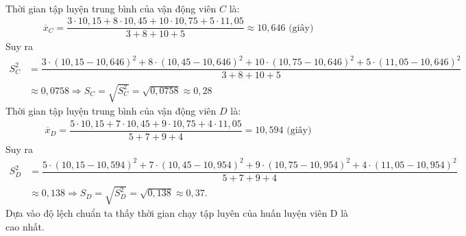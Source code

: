\begin{bt}
{\begin{align*}
		\end{align*}
		Thời gian tập luyện trung bình của vận động viên $C$ là:
		\begin{align*}
			\overline{{x}}_{C}=\dfrac{3 \cdot 10,15+8 \cdot 10,45+10 \cdot 10,75+5 \cdot 11,05}{3+8+10+5} \approx 10,646 \text{ (giây)}
		\end{align*}
		Suy ra
		\begin{align*}
			{S}_{{C}}^{2} & =\dfrac{3 \cdot(10,15-10,646)^{2}+8 \cdot(10,45-10,646)^{2}+10 \cdot(10,75-10,646)^{2}+5 \cdot(11,05-10,646)^{2}}{3+8+10+5} \\
			& \approx 0,0758 \Rightarrow {S}_{{C}}=\sqrt{{S}_{{C}}^{2}}=\sqrt{0,0758} \approx 0,28
		\end{align*}
		Thời gian tập luyện trung bình của vận động viên $D$ là:
		\begin{align*}
			\overline{{x}}_{{D}}=\dfrac{5 \cdot 10,15+7 \cdot 10,45+9 \cdot 10,75+4 \cdot 11,05}{5+7+9+4}=10,594  \text{ (giây)}
		\end{align*}
		Suy ra
		\begin{align*}
			{S}_{D}^{2} & =\dfrac{5 \cdot(10,15-10,594)^{2}+7 \cdot(10,45-10,954)^{2}+9 \cdot(10,75-10,954)^{2}+4 \cdot(11,05-10,954)^{2}}{5+7+9+4} \\
			& \approx 0,138 \Rightarrow {S}_{D}=\sqrt{{S}_{D}^{2}}=\sqrt{0,138} \approx 0,37.
		\end{align*}
		Dựa vào độ lệch chuẩn ta thấy thời gian chạy tập luyên của huấn luyện viên D là cao nhất.
	}
\end{bt}

